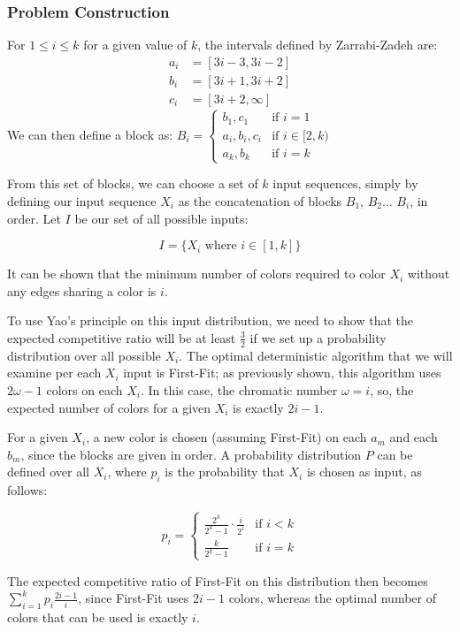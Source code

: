 \subsubsection{Problem Construction}
For $1\le i\le k$ for a given value of $k$, the intervals defined by Zarrabi-Zadeh \cite{zarrabi} are: 
\begin{align*}
	a_i &= [3i-3, 3i-2] \\
	b_i &= [3i+1, 3i+2] \\
	c_i &= [3i+2, \infty]
\end{align*}
We can then define a block as:
$B_i = \begin{cases} {b_1, c_1} &\mbox{if } i = 1 \\
{a_i, b_i, c_i} & \mbox{if } i \in [2,k) \\
 {a_k, b_k} &\mbox{if } i = k \end{cases}$ 

From this set of blocks, we can choose a set of $k$ input sequences, simply by defining our input sequence $X_i$ as the concatenation of blocks $B_1$, $B_2$... $B_i$, in order. Let $I$ be our set of all possible inputs:

\[I = \{X_i \text{ where } i \in [1,k]\}\]

It can be shown that the minimum number of colors required to color $X_i$ without any edges sharing a color is $i$.

To use Yao's principle on this input distribution, we need to show that the expected competitive ratio will be at least $\frac{3}{2}$ if we set up a probability distribution over all possible $X_i$. The optimal deterministic algorithm that we will examine per each $X_i$ input is First-Fit; as previously shown, this algorithm uses $2\omega-1$ colors on each $X_i$. In this case, the chromatic number $\omega=i$, so, the expected number of colors for a given $X_i$ is exactly $2i-1$.

For a given $X_i$, a new color is chosen (assuming First-Fit) on each $a_m$ and each $b_m$, since the blocks are given in order. A probability distribution $P$ can be defined over all $X_i$, where $p_i$ is the probability that $X_i$ is chosen as input, as follows:

\[p_i = \begin{cases} \frac{2^k}{2^k-1}\cdot\frac{i}{2^i} &\mbox{if } i < k \\
\frac{k}{2^k-1} & \mbox{if } i = k 
 \end{cases}\]

The expected competitive ratio of First-Fit on this distribution then becomes $\sum_{i=1}^k p_i\frac{2i-1}{i}$, since First-Fit uses $2i-1$ colors, whereas the optimal number of colors that can be used is exactly $i$.

